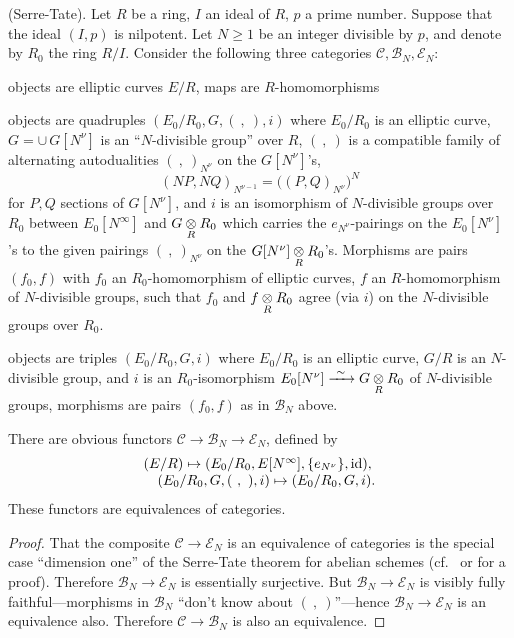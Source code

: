 \begin{theorem}\label{thm:2.9.1}
(Serre-Tate). Let $R$ be a ring, $I$ an ideal of $R$, $p$ a prime number. Suppose that the ideal $(I, p)$ is nilpotent. Let $N \ge 1$ be an integer divisible by $p$, and denote by $R_0$ the ring $R/I$. Consider the following three categories $\mathcal{C}, \mathcal{B}_N, \mathcal{E}_N$:
\begin{description}[leftmargin=3.4em, labelindent=0.6em, labelsep=0.5em, itemsep=0.6em]
\item[$\mathcal{C}$ :] objects are elliptic curves $E/R$, maps are $R$-homomorphisms
\item[$\mathcal{B}_N$ :] objects are quadruples $(E_0/R_0, G, (\ ,\ ), i)$ where $E_0/R_0$ is an elliptic curve, $G = \cup\, G[N^\nu]$ is an ``$N$-divisible group'' over $R$, $(\ ,\ )$ is a compatible family of alternating autodualities $(\ ,\ )_{N^\nu}$ on the $G[N^\nu]$'s,
\[
(NP, NQ)_{N^{\nu-1}} = \bigl((P, Q)_{N^\nu}\bigr)^N
\]
for $P, Q$ sections of $G[N^\nu]$, and $i$ is an isomorphism of $N$-divisible groups over $R_0$ between $E_0[N^\infty]$ and $G \underset{R}{\otimes} R_0$ which carries the $e_{N^\nu}$-pairings on the $E_0[N^\nu]$'s to the given pairings $(\ ,\ )_{N^\nu}$ on the $G[N^\nu] \underset{R}{\otimes} R_0$'s. Morphisms are pairs $(f_0, f)$ with $f_0$ an $R_0$-homomorphism of elliptic curves, $f$ an $R$-homomorphism of $N$-divisible groups, such that $f_0$ and $f \underset{R}{\otimes} R_0$ agree (via $i$) on the $N$-divisible groups over $R_0$.
\item[$\mathcal{E}_N$ :] objects are triples $(E_0/R_0, G, i)$ where $E_0/R_0$ is an elliptic curve, $G/R$ is an $N$-divisible group, and $i$ is an $R_0$-isomorphism $E_0[N^\nu] \xrightarrow{\ \sim\ } G \underset{R}{\otimes} R_0$ of $N$-divisible groups, morphisms are pairs $(f_0, f)$ as in $\mathcal{B}_N$ above.
\end{description}

There are obvious functors $\mathcal{C} \to \mathcal{B}_N \to \mathcal{E}_N$, defined by
\[
\begin{array}{@{}l@{}}
(E/R) \mapsto (E_0/R_0, E[N^\infty], \{e_{N^\nu}\}, \mathrm{id}), \\
\quad (E_0/R_0, G, (\ ,\ ), i) \mapsto (E_0/R_0, G, i).
\end{array}
\]
These functors are equivalences of categories.
\end{theorem}

\begin{proof}
That the composite $\mathcal{C} \to \mathcal{E}_N$ is an equivalence of categories is the special case ``dimension one'' of the Serre-Tate theorem for abelian schemes (cf.~\cite{Mes} or \cite{K5} for a proof). Therefore $\mathcal{B}_N \to \mathcal{E}_N$ is essentially surjective. But $\mathcal{B}_N \to \mathcal{E}_N$ is visibly fully faithful---morphisms in $\mathcal{B}_N$ ``don't know about $(\ ,\ )$''---hence $\mathcal{B}_N \to \mathcal{E}_N$ is an equivalence also. Therefore $\mathcal{C} \to \mathcal{B}_N$ is also an equivalence.
\end{proof}

